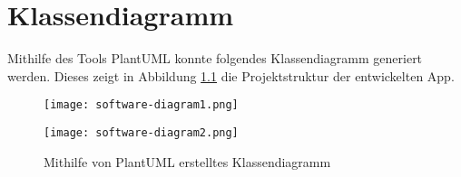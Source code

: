 
\chapter{Klassendiagramm}

Mithilfe des Tools PlantUML konnte folgendes Klassendiagramm generiert werden. Dieses zeigt in Abbildung \ref{fig:softwarediagram} die Projektstruktur der entwickelten App.

\begin{figure}[H]
    \centering
    \texttt{[image: software-diagram1.png]}
\end{figure}

\begin{figure}[H]
    \centering
    \texttt{[image: software-diagram2.png]}
    \caption{Mithilfe von PlantUML erstelltes Klassendiagramm}
    \label{fig:softwarediagram}
\end{figure}